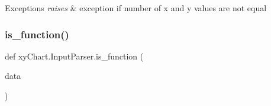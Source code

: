 \begin{DoxyExceptions}{Exceptions}
{\em raises} & exception if number of x and y values are not equal \\
\hline
\end{DoxyExceptions}
\hypertarget{namespacexy_chart_1_1_input_parser_adc18d7c46d4d8a5efd5a5fa8e9c04fe2}{}\label{namespacexy_chart_1_1_input_parser_adc18d7c46d4d8a5efd5a5fa8e9c04fe2} 
\subsubsection{\texorpdfstring{is\+\_\+function()}{is\_function()}}
{\footnotesize\ttfamily def xy\+Chart.\+Input\+Parser.\+is\+\_\+function (\begin{DoxyParamCaption}\item[{}]{data }\end{DoxyParamCaption})}

